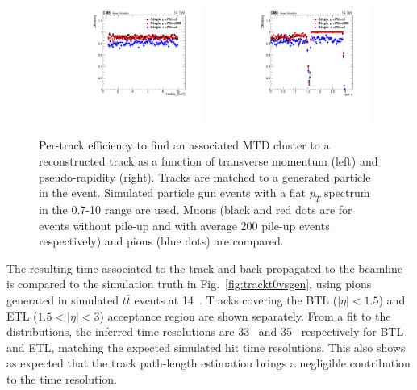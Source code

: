 \begin{figure}[!hbtp]
\centering
\includegraphics[width=0.48\textwidth]{fig/performance/ClusterAndTracks/noPreliminary/divide_mtdTrack_pt_by_track_pt_mupiPUcomp-4.pdf}
\includegraphics[width=0.48\textwidth]{fig/performance/ClusterAndTracks/noPreliminary/divide_mtdTrack_eta_by_track_eta_mupiPUcomp-4.pdf}
\caption{Per-track efficiency to find an associated MTD cluster to a reconstructed track as a function of transverse momentum (left) and pseudo-rapidity (right). Tracks are matched to a generated particle in the event. Simulated particle gun events with a flat $p_T$ spectrum in the 0.7-10 range are used. Muons (black and red dots are for events without pile-up and with average 200 pile-up events respectively) and pions (blue dots) are compared.}
\label{fig:trackclusterefficiency}
\end{figure}

The resulting time associated to the track and back-propagated to the beamline is compared to the simulation truth in Fig.~\ref{fig:trackt0vsgen}, using pions generated in simulated $t\bar{t}$ events at 14~. Tracks covering the BTL ($|\eta|<1.5$) and ETL ($1.5<|\eta|<3$) acceptance region are shown separately. From a fit to the distributions, the inferred time resolutions are 33~ and 35~ respectively for BTL and ETL, matching the expected simulated hit time resolutions. This also shows as expected that the track path-length estimation brings a negligible contribution to the time resolution.

